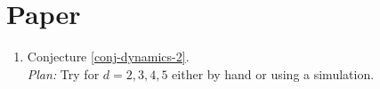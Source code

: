 \section{Paper \cite{hartarsky2023local}}
\begin{enumerate}
	\item Conjecture \ref{conj-dynamics-2}.\\ \textit{Plan:} Try for $d = 2,3,4,5$ either by hand or using a simulation.
\end{enumerate}

